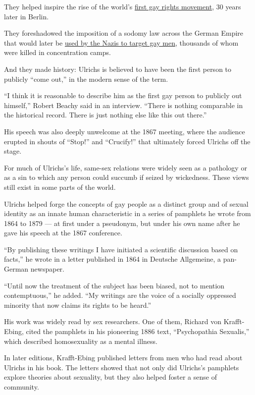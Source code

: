They helped inspire the rise of the world's
\href{https://www.npr.org/2014/12/17/371424790/between-world-wars-gay-culture-flourished-in-berlin}{first
gay rights movement}, 30 years later in Berlin.

They foreshadowed the imposition of a sodomy law across the German
Empire that would later be
\href{https://encyclopedia.ushmm.org/content/en/article/persecution-of-homosexuals-in-the-third-reich}{used
by the Nazis to target gay men}, thousands of whom were killed in
concentration camps.

And they made history: Ulrichs is believed to have been the first person
to publicly ``come out,'' in the modern sense of the term.

``I think it is reasonable to describe him as the first gay person to
publicly out himself,'' Robert Beachy said in an interview. ``There is
nothing comparable in the historical record. There is just nothing else
like this out there.''

His speech was also deeply unwelcome at the 1867 meeting, where the
audience erupted in shouts of ``Stop!'' and ``Crucify!'' that ultimately
forced Ulrichs off the stage.

For much of Ulrichs's life, same-sex relations were widely seen as a
pathology or as a sin to which any person could succumb if seized by
wickedness. These views still exist in some parts of the world.

Ulrichs helped forge the concepts of gay people as a distinct group and
of sexual identity as an innate human characteristic in a series of
pamphlets he wrote from 1864 to 1879 --- at first under a pseudonym, but
under his own name after he gave his speech at the 1867 conference.

``By publishing these writings I have initiated a scientific discussion
based on facts,'' he wrote in a letter published in 1864 in Deutsche
Allgemeine, a pan-German newspaper.

``Until now the treatment of the subject has been biased, not to mention
contemptuous,'' he added. ``My writings are the voice of a socially
oppressed minority that now claims its rights to be heard.''

His work was widely read by sex researchers. One of them, Richard von
Krafft-Ebing, cited the pamphlets in his pioneering 1886 text,
``Psychopathia Sexualis,'' which described homosexuality as a mental
illness.

In later editions, Krafft-Ebing published letters from men who had read
about Ulrichs in his book. The letters showed that not only did
Ulrichs's pamphlets explore theories about sexuality, but they also
helped foster a sense of community.

